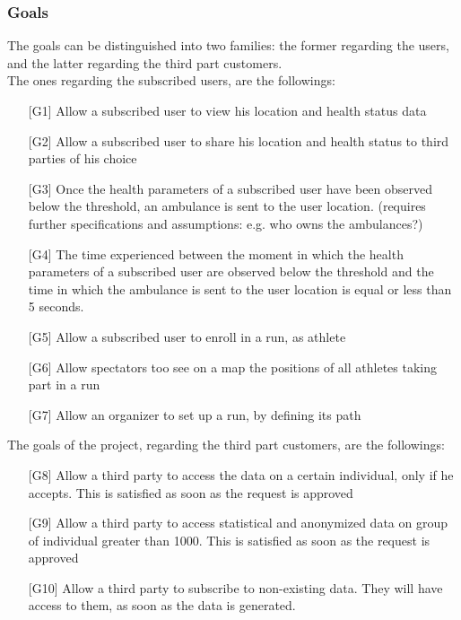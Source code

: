 \subsubsection{Goals}
The goals can be distinguished into two families: the former regarding the users, and the latter regarding the third part customers.\\
The ones regarding the subscribed users, are the followings:
\begin{enumerate}
\item[{[G1]}] Allow a subscribed user to view his location and health status data 
\item[{[G2]}] Allow a subscribed user to share his location and health status to third parties of his choice
\item[{[G3]}] Once the health parameters of a subscribed user have been observed 
below the threshold, an ambulance is sent to the user location. (requires further specifications and assumptions: e.g. who owns the ambulances?)
\item[{[G4]}] The time experienced between the moment in which the health parameters of a subscribed user are observed below the threshold and the time in which the ambulance is sent to the user location is equal or less than 5 seconds. 
\item[{[G5]}] Allow a subscribed user to enroll in a run, as athlete
\item[{[G6]}] Allow spectators too see on a map the positions of all athletes taking part in a run
\item[{[G7]}] Allow an organizer to set up a run, by defining its path
\end{enumerate}
The goals of the project, regarding the third part customers, are the followings:
\begin{enumerate}
\item[{[G8]}] Allow a third party to access the data on a certain individual, only if he accepts. This is satisfied as soon as the request is approved
\item[{[G9]}] Allow a third party to access statistical and anonymized data on group of individual greater than 1000. This is satisfied as soon as the request is approved
\item[{[G10]}] Allow a third party to subscribe to non-existing data. They will have access to them, as soon as the data is generated. 
\end{enumerate}